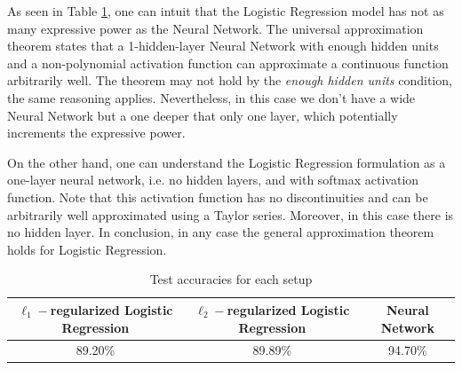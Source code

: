 \documentclass{article}
\begin{document}
As seen in Table \ref{tab:acc}, one can intuit that the Logistic Regression model has not as many expressive power as the Neural Network. The universal approximation theorem states that a 1-hidden-layer Neural Network with enough hidden units and a non-polynomial activation function can approximate a continuous function arbitrarily well. The theorem may not hold by the \textit{enough hidden units} condition, the same reasoning applies. Nevertheless, in this case we don't have a wide Neural Network but a one deeper that only one layer, which potentially increments the expressive power.

On the other hand, one can understand the Logistic Regression formulation as a one-layer neural network, i.e. no hidden layers, and with softmax activation function. Note that this activation function has no discontinuities and can be arbitrarily well approximated using a Taylor series. Moreover, in this case there is no hidden layer. In conclusion, in any case the general approximation theorem holds for Logistic Regression.

\begin{table}[H]
    \centering
    \begin{tabular}{ccc}
        \toprule
        $\ell_1-$regularized Logistic Regression &  $\ell_2-$regularized Logistic Regression & Neural Network\\
        \midrule
        89.20\% & 89.89\% & 94.70\% \\
        \bottomrule
    \end{tabular}
    \caption{Test accuracies for each setup}
    \label{tab:acc}
\end{table}
\end{document}
